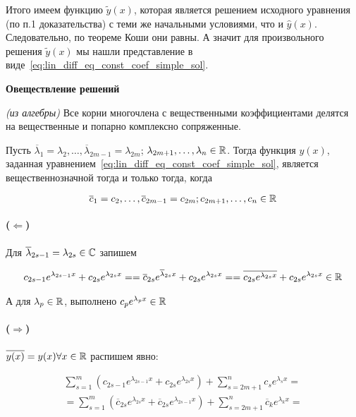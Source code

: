 Итого имеем функцию $\tilde{y}(x)$, которая является решением исходного уравнения (по п.1 доказательства) с теми же начальными условиями, что и $\hat{y}(x)$.
Следовательно, по теореме Коши они равны.
А значит для произвольного решения $\tilde{y}(x)$ мы нашли представление в виде~\ref{eq:lin_diff_eq_const_coef_simple_sol}.

\Endproof

\textbf{Овеществление решений}

\Statement \textit{(из алгебры)} Все корни многочлена с вещественными коэффициентами делятся на вещественные и попарно комплексно сопряженные.

\Statement Пусть $\overline{\lambda}_1 = \lambda_2, \dots, \overline{\lambda}_{2m-1} = \lambda_{2m}$; $\lambda_{2m+1}, \dots, \lambda_n \in \mathbb{R}$. Тогда функция $y(x)$, заданная уравнением~\ref{eq:lin_diff_eq_const_coef_simple_sol}, является вещественнозначной тогда и только тогда, когда

\begin{equation*}
    \overline{c}_1 = c_2, \dots, \overline{c}_{2m-1} = c_{2m}; c_{2m+1}, \dots, c_n \in \mathbb{R}
\end{equation*}

\Proof

\paragraph{($\Leftarrow$)} Для $\overline{\lambda}_{2s-1} = \lambda_{2s} \in \mathbb{C}$ запишем

\begin{align*}
    c_{2s-1} e^{\lambda_{2s-1} x} + c_{2s} e^{\lambda_{2s} x} =
    = \overline{c}_{2s} e^{\overline{\lambda}_{2s} x} + c_{2s} e^{\lambda_{2s} x} =
    = \overline{c_{2s} e^{\lambda_{2s} x}} + c_{2s} e^{\lambda_{2s} x} \in \mathbb{R}
\end{align*}

А для $\lambda_p \in \mathbb{R}$, выполнено $c_p e^{\lambda_p x} \in \mathbb{R}$

\paragraph{($\Rightarrow$)} $\overline{y(x)} = y(x) \forall x \in \mathbb{R}$ распишем явно:

\begin{align*}
    \sum_{s=1}^m \left(c_{2s-1} e^{\lambda_{2s-1} x} + c_{2s} e^{\lambda_{2s} x}\right) + \sum_{s=2m+1}^n c_s e^{\lambda_s x} = \\
    = \sum_{s=1}^m \left(\overline{c}_{2s} e^{\lambda_{2s} x} + \overline{c}_{2s} e^{\lambda_{2s-1} x}\right) + \sum_{s=2m+1}^n \overline{c}_k e^{\lambda_k x} = \\
\end{align*}

